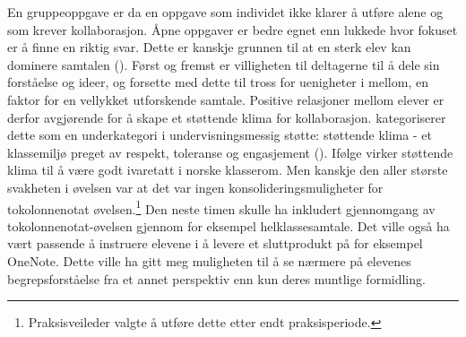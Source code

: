 \documentclass[main.tex]{subfiles}
\begin{document}
En gruppeoppgave er da en oppgave som individet ikke klarer å utføre alene og som 
krever kollaborasjon. Åpne oppgaver er bedre egnet enn lukkede hvor fokuset er å finne 
en riktig svar. Dette er kanskje grunnen til at en sterk elev kan dominere samtalen 
(). Først og fremst er villigheten til deltagerne til å dele sin forståelse 
og ideer, og forsette med dette til tross for uenigheter i mellom, en faktor for en vellykket 
utforskende samtale. Positive relasjoner mellom elever er derfor avgjørende for å skape et støttende 
klima for kollaborasjon.  kategoriserer dette som en underkategori i 
undervisningsmessig støtte: støttende klima - et klassemiljø preget av respekt, toleranse og 
engasjement (). Ifølge  virker støttende klima til å være 
godt ivaretatt i norske klasserom. Men kanskje den aller største svakheten i øvelsen var at det 
var ingen konsolideringsmuligheter for tokolonnenotat øvelsen.\footnote[5]{Praksisveileder valgte 
å utføre dette etter endt praksisperiode.} Den neste timen skulle ha inkludert gjennomgang av 
tokolonnenotat-øvelsen gjennom for eksempel helklassesamtale. Det ville også ha vært passende
å instruere elevene i å levere et sluttprodukt på for eksempel OneNote. Dette ville ha gitt meg
muligheten til å se nærmere på elevenes begrepsforståelse fra et annet perspektiv enn kun deres 
muntlige formidling.  
\end{document}
